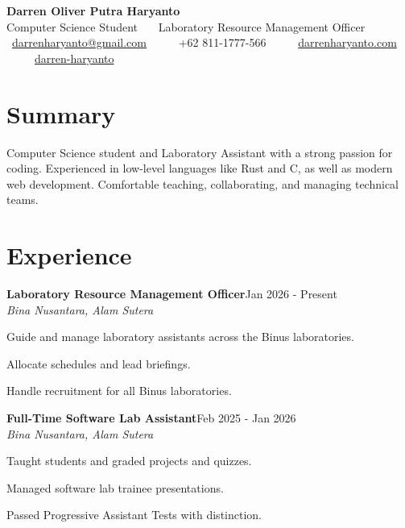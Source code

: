 \documentclass[a4paper,11pt]{article}
\newcommand{\entry}[4]{%
  \textbf{#1}\hfill{\color{muted}#2}\\[0.15em]
  {\color{muted}\textit{#3}}\hfill{\color{muted}#4}\par\vspace{0.15em}%
}
\begin{document}
\begin{center}
  {\Huge\bfseries Darren Oliver Putra Haryanto}\\[0.35em]
  {\color{muted}Computer Science Student \ \textbullet\ \ Laboratory Resource Management Officer}\\[0.55em]
  \small
  \faEnvelope[regular]\ \href{mailto:darrenharyanto@gmail.com}{darrenharyanto@gmail.com}
  \ \ \textbullet\ \
  \faPhone\ +62 811-1777-566
  \ \ \textbullet\ \
  \faGlobe\ \href{https://darrenharyanto.com}{darrenharyanto.com}
  \ \ \textbullet\ \
  \faLinkedin\ \href{https://www.linkedin.com/in/darren-haryanto-164841264}{darren-haryanto}
\end{center}

\vspace{0.3em}

\section{Summary}
Computer Science student and Laboratory Assistant with a strong passion for coding. Experienced in low-level languages like Rust and C, as well as modern web development. Comfortable teaching, collaborating, and managing technical teams.

\section{Experience}
\entry{Laboratory Resource Management Officer}{Jan 2026 - Present}{Bina Nusantara, Alam Sutera}{}
\begin{tight}
  \item Guide and manage laboratory assistants across the Binus laboratories.
  \item Allocate schedules and lead briefings.
  \item Handle recruitment for all Binus laboratories.
\end{tight}
\vspace{0.4em}

\entry{Full-Time Software Lab Assistant}{Feb 2025 - Jan 2026}{Bina Nusantara, Alam Sutera}{}
\begin{tight}
  \item Taught students and graded projects and quizzes.
  \item Managed software lab trainee presentations.
  \item Passed Progressive Assistant Tests with distinction.
\end{tight}
\vspace{0.4em}
\end{document}
